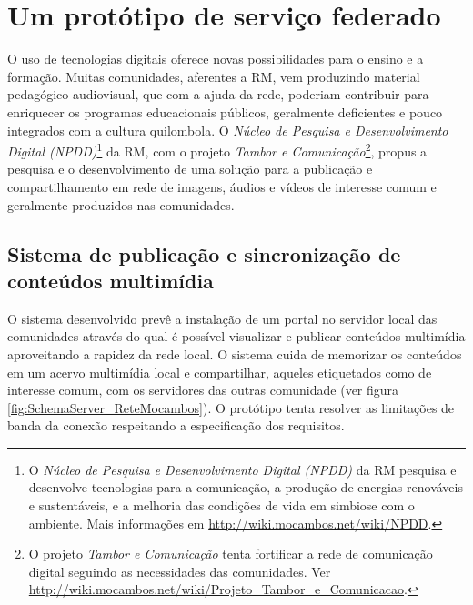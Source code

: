 
\chapter{Um protótipo de serviço federado}
\label{Capitulo4}

O uso de tecnologias digitais oferece novas possibilidades para o
ensino e a formação. Muitas comunidades, aferentes a RM, vem
produzindo material pedagógico audiovisual, que com a ajuda da rede,
poderiam contribuir para enriquecer os programas educacionais
públicos, geralmente deficientes e pouco integrados com a cultura
quilombola. O \emph{Núcleo de Pesquisa e Desenvolvimento Digital
  (NPDD)}\footnote{O \emph{Núcleo de Pesquisa e Desenvolvimento
    Digital (NPDD)} da RM pesquisa e desenvolve tecnologias para a
  comunicação, a produção de energias renováveis e sustentáveis, e a
  melhoria das condições de vida em simbiose com o ambiente. Mais
  informações em \url{http://wiki.mocambos.net/wiki/NPDD}.} da RM, com
o projeto \emph{Tambor e Comunicação}\footnote{O projeto \emph{Tambor
    e Comunicação} tenta fortificar a rede de comunicação digital
  seguindo as necessidades das comunidades. Ver
  \url{http://wiki.mocambos.net/wiki/Projeto_Tambor_e_Comunicacao}.},
propus a pesquisa e o desenvolvimento de uma solução para a publicação
e compartilhamento em rede de imagens, áudios e vídeos de interesse
comum e geralmente produzidos nas comunidades.

\section{Sistema de publicação e sincronização de conteúdos multimídia}
O sistema desenvolvido prevê a instalação de um portal no servidor
local das comunidades através do qual é possível visualizar e publicar
conteúdos multimídia aproveitando a rapidez da rede local. O sistema
cuida de memorizar os conteúdos em um acervo multimídia local e
compartilhar, aqueles etiquetados como de interesse comum, com os
servidores das outras comunidade (ver figura
\ref{fig:SchemaServer_ReteMocambos}). O protótipo tenta resolver as
limitações de banda da conexão respeitando a especificação dos
requisitos.

